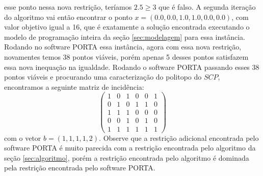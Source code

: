 esse ponto nessa nova restrição, teríamos $2.5 \ge 3$ que é falso. A segunda iteração do algoritmo vai então encontrar o ponto $x=(0.0, 0.0, 1.0, 1.0, 0.0, 0.0)$, com valor objetivo igual a 16, que 
é exatamente a solução encontrada executando o modelo de programação inteira da seção \ref{sec:modelagem} para essa instância.
Rodando no software PORTA essa instância, agora com essa nova restrição, novamentes temos 38 pontos viáveis, 
porém apenas 5 desses pontos satisfazem essa nova inequação na igualdade. Rodando o software PORTA passando esses 38
pontos viáveis e procurando uma caracterização do politopo do $SCP$, encontramos a seguinte matriz de incidência:
$$
\begin{pmatrix} 
    1 & 0 & 1 & 0 & 0 & 1 \\ 
    0 & 1 & 0 & 1 & 1 & 0 \\ 
    1 & 1 & 1 & 0 & 0 & 0 \\ 
    0 & 0 & 1 & 0 & 1 & 0 \\ 
    1 & 1 & 1 & 1 & 1 & 1
\end{pmatrix}
$$
com o vetor $b=(1,1,1,1,2)$. Observe que a restrição adicional encontrada pelo software PORTA é muito parecida
com a restrição encontrada pelo algoritmo da seção \ref{sec:algoritmo}, porém a restrição encontrada pelo algoritmo
é dominada pela restrição encontrada pelo software PORTA.